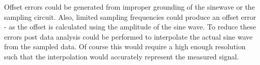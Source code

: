\documentclass[main.tex]{subfile}
\begin{document}
Offset errors could be generated from improper grounding of the sinewave or the
sampling circuit. Also, limited sampling frequencies could produce an offset
error - as the offset is calculated using the amplitude of the sine wave. To
reduce these errors post data analysis could be performed to interpolate the
actual sine wave from the sampled data. Of course this would require a high
enough resolution such that the interpolation would accurately represent the
measured signal.

\end{document}

